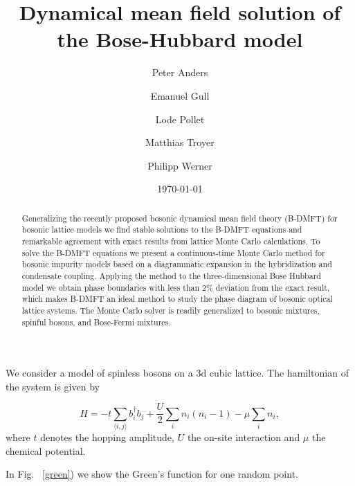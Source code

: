 \documentclass[prl, superscriptaddress, showpacs, twocolumn]{revtex4}
\begin{document}
\title{Dynamical mean field solution of the Bose-Hubbard model}
\author{Peter Anders}
\author{Emanuel Gull}
\author{Lode Pollet}
\author{Matthias Troyer}
\author{Philipp Werner}
\date{\today}

\begin{abstract}
Generalizing the recently proposed bosonic dynamical mean field theory (B-DMFT)  for bosonic lattice models  we find stable solutions to the B-DMFT equations and remarkable agreement with exact results from lattice Monte Carlo calculations. To solve the B-DMFT equations we present a  continuous-time Monte Carlo method for bosonic impurity models based on a diagrammatic expansion in the hybridization and condensate coupling. Applying the method
to the three-dimensional Bose Hubbard model we obtain phase boundaries with less than $2$\% deviation from the exact result, which makes B-DMFT an ideal method to study the phase diagram of bosonic optical lattice systems. The Monte Carlo solver is readily generalized to bosonic mixtures, spinful bosons, and Bose-Fermi mixtures.
\end{abstract}


\hyphenation{}

\maketitle


We consider a model of spinless bosons on a 3d cubic lattice. The hamiltonian of the system is given by

\begin{equation}
H = - t \sum_{\langle i,j\rangle} b_i^{\dagger}b_j +\frac{U}{2}\sum_i n_i (n_i - 1) - \mu \sum_i n_i,
\label{hamiltonian}
\end{equation}
where $t$ denotes the hopping amplitude, $U$ the on-site interaction and $\mu$ the chemical potential. 

In Fig. ~\ref{green}) we show the Green's function for one random point.
\end{document}
